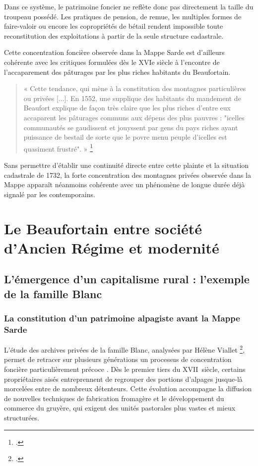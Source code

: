 \documentclass[12pt,a4paper]{report}
\begin{document}
	Dans ce système, le patrimoine foncier ne reflète donc pas directement la taille du troupeau possédé. Les pratiques de pension, de remue, les multiples formes de faire-valoir ou encore les copropriétés de bétail rendent impossible toute reconstitution des exploitations à partir de la seule structure cadastrale.

Cette concentration foncière observée dans la Mappe Sarde est d'ailleurs cohérente avec les critiques formulées dès le XVIe siècle à l'encontre de l'accaparement des pâturages par les plus riches habitants du Beaufortain.

\begin{quote}
	« Cette tendance, qui mène à la constitution des montagnes particulières ou privées [...]. En 1552, une supplique des habitants du mandement de Beaufort explique de façon très claire que les plus riches d'entre eux accaparent les pâturages communs aux dépens des plus pauvres : "icelles communautés se gaudissent et jouyssent par gens du pays riches ayant puissance de bestail de sorte que le povre menu peuple d'icelles est quasiment frustré". »
	\footcite[125]{Mouthon2019MontagnesMedievales}
\end{quote}

Sans permettre d'établir une continuité directe entre cette plainte et la situation cadastrale de 1732, la forte concentration des montagnes privées observée dans la Mappe apparaît néanmoins cohérente avec un phénomène de longue durée déjà signalé par les contemporains.
	
	
	
	
	

\chapter{Le Beaufortain entre société d'Ancien Régime et modernité}

\section{L'émergence d'un capitalisme rural : l'exemple de la famille Blanc}
	\subsection{La constitution d'un patrimoine alpagiste avant la Mappe Sarde}
	
	L'étude des archives privées de la famille Blanc, analysées par Hélène Viallet \footcite{Viallet1990Blanc}, permet de retracer sur plusieurs générations un processus de concentration foncière particulièrement précoce . Dès le premier tiers du XVII\ieme\ siècle, certains propriétaires aisés entreprennent de regrouper des portions d'alpages jusque-là morcelées entre de nombreux détenteurs. Cette évolution accompagne la diffusion de nouvelles techniques de fabrication fromagère et le développement du commerce du gruyère, qui exigent des unités pastorales plus vastes et mieux structurées.
	
\end{document}
